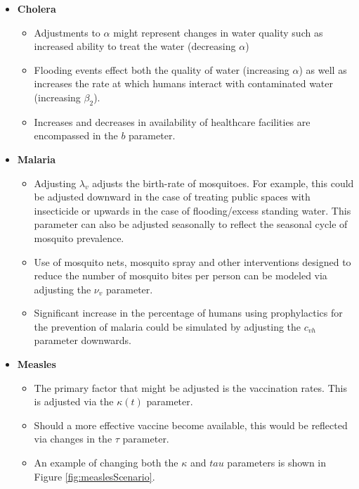 \documentclass[letter,12pt, usenames,dvipsnames]{article}
\begin{document}
\begin{itemize}
    \item {\bf Cholera}
        \begin{itemize}
            \item Adjustments to $\alpha$ might represent changes in water quality such as increased ability to treat the water (decreasing $\alpha$)
            \item Flooding events effect both the quality of water (increasing $\alpha$) as well as increases the rate at which humans interact with contaminated water (increasing $\beta_2$).
            \item Increases and decreases in availability of healthcare facilities are encompassed in the $b$ parameter.
        \end{itemize}
    \item {\bf Malaria}
        \begin{itemize}
            \item Adjusting $\lambda_v$ adjusts the birth-rate of mosquitoes.  For example, this could be adjusted downward in the case of treating public spaces with insecticide or upwards in the case of flooding/excess standing water.  This parameter can also be adjusted seasonally to reflect the seasonal cycle of mosquito prevalence. 
            \item Use of mosquito nets, mosquito spray and other interventions designed to reduce the number of mosquito bites per person can be modeled via adjusting the $\nu_v$ parameter.
            \item Significant increase in the percentage of humans using prophylactics for the prevention of malaria could be simulated by adjusting the $c_{vh}$ parameter downwards.
        \end{itemize}
    \item {\bf Measles}
        \begin{itemize}
            \item The primary factor that might be adjusted is the vaccination rates.  This is adjusted via the $\kappa (t)$ parameter. 
            \item Should a more effective vaccine become available, this would be reflected via changes in the $\tau$ parameter.
            \item An example of changing both the $\kappa$ and $tau$ parameters is shown in Figure \ref{fig:measlesScenario}.
        \end{itemize}
\end{itemize}
\end{document}

